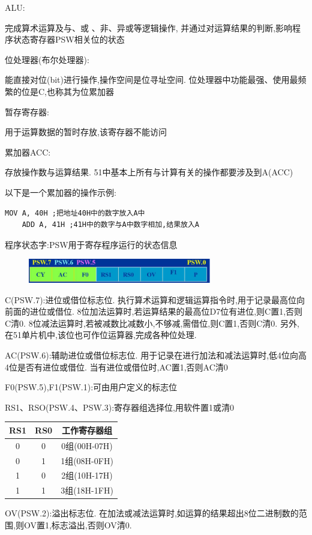 \documentclass[12pt,a4paper,oneside]{ctexart}
\begin{document}
ALU:

完成算术运算及与、或 、非、异或等逻辑操作,
并通过对运算结果的判断,影响程序状态寄存器PSW相关位的状态

位处理器(布尔处理器):

能直接对位(bit)进行操作,操作空间是位寻址空间.
位处理器中功能最强、使用最频繁的位是C,也称其为位累加器

暂存寄存器:

用于运算数据的暂时存放,该寄存器不能访问

累加器ACC:

存放操作数与运算结果.
51中基本上所有与计算有关的操作都要涉及到A(ACC)

以下是一个累加器的操作示例:
\begin{lstlisting}[language=MCS51]
    MOV A, 40H ;把地址40H中的数字放入A中
    ADD A, 41H ;41H中的数字与A中数字相加,结果放入A
\end{lstlisting}

程序状态字:PSW用于寄存程序运行的状态信息
\begin{figure}[H]
    \centering
    \includegraphics[width=8cm]{photos/PSW.png}
\end{figure}

C(PSW.7):进位或借位标志位.
执行算术运算和逻辑运算指令时,用于记录最高位向前面的进位或借位.
8位加法运算时,若运算结果的最高位D7位有进位,则C置1,否则C清0.
8位减法运算时,若被减数比减数小,不够减,需借位,则C置1,否则C清0.
另外,在51单片机中,该位也可作位运算器,完成各种位处理.

AC(PSW.6):辅助进位或借位标志位.
用于记录在进行加法和减法运算时,低4位向高4位是否有进位或借位.
当有进位或借位时,AC置1,否则AC清0

F0(PSW.5),F1(PSW.1):可由用户定义的标志位

RS1、RSO(PSW.4、PSW.3):寄存器组选择位,用软件置1或清0
\begin{table}[H]
    \centering
    \begin{tabular}{|c|c|c|}
    \hline
    RS1 & RS0 & 工作寄存器组      \\ \hline
    0   & 0   & 0组(00H-07H) \\ \hline
    0   & 1   & 1组(08H-0FH) \\ \hline
    1   & 0   & 2组(10H-17H) \\ \hline
    1   & 1   & 3组(18H-1FH) \\ \hline
    \end{tabular}
\end{table}
OV(PSW.2):溢出标志位.
在加法或减法运算时,如运算的结果超出8位二进制数的范围,则OV置1,标志溢出,否则OV清0.
\end{document}
